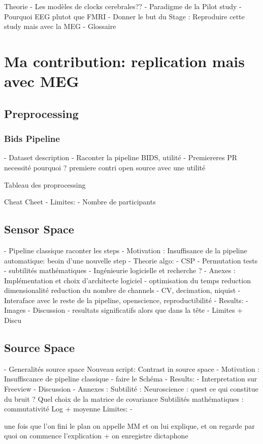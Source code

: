 Theorie
- Les modèles de clocks cerebrales??
- Paradigme de la Pilot study
- Pourquoi EEG plutot que FMRI
- Donner le but du Stage : 
    Reproduire cette study mais avec la MEG
- Glossaire

\chapter{Ma contribution: replication mais avec MEG}



\section{Preprocessing}

\subsection{Bids Pipeline}
- Dataset description
- Raconter la pipeline BIDS, utilité
- Premiereres PR necessité pourquoi ?
    premiere contri open source
    avec une utilité


Tableau des proprocessing

Cheat Cheet
- Limites:
    - Nombre de participants

\section{Sensor Space}

- Pipeline classique raconter les steps
- Motivation : Insuffisance de la pipeline automatique: beoin d'une nouvelle step
- Theorie algo:
    - CSP
    - Permutation tests
    - subtilités mathématiques
    - Ingénieurie logicielle et recherche ?
- Anexes : Implémentation et choix d'architecte logiciel
    - optimisation du temps
        reduction dimensionalité
        reduction du nombre de channels
    - CV, decimation, niquist
    - Interaface avec le reste de la pipeline, openscience, reproductibilité
- Results:
    - Images
- Discussion
    - resultats significatifs alors que dans la tête
- Limites + Discu

\section{Source Space}

- Generalités source space
Nouveau script: Contrast in source space
    - Motivation : Insuffiscance de pipeline classique
    - faire le Schéma
- Results:
    - Interpretation sur Freeview
- Discussion
- Annexes : Subtilité : 
    Neuroscience : quest ce qui constitue du bruit ? Quel choix de la matrice de covariance
    Subtilités mathématiques :  commutativité Log + moyenne
Limites:
    - 





une fois que l'on fini le plan on appelle MM et on lui explique, et on regarde par quoi on commence l'explication +  on enregistre dictaphone